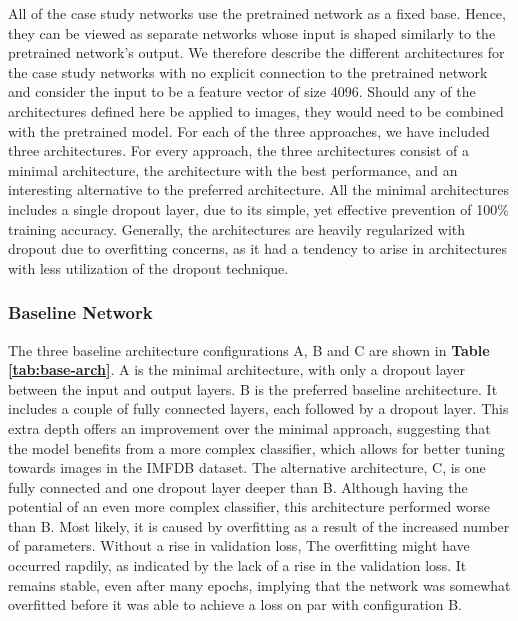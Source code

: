 
All of the case study networks use the pretrained network as a fixed base. Hence, they can be viewed as separate networks whose input is shaped similarly to the pretrained network's output. We therefore describe the different architectures for the case study networks with no explicit connection to the pretrained network and consider the input to be a feature vector of size 4096. Should any of the architectures defined here be applied to images, they would need to be combined with the pretrained model. For each of the three approaches, we have included three architectures. For every approach, the three architectures consist of a minimal architecture, the architecture with the best performance, and an interesting alternative to the preferred architecture. All the minimal architectures includes a single dropout layer, due to its simple, yet effective prevention of 100\% training accuracy. Generally, the architectures are heavily regularized with dropout due to overfitting concerns, as it had a tendency to arise in architectures with less utilization of the dropout technique. 


\subsubsection{Baseline Network}



The three baseline architecture configurations A, B and C are shown in \textbf{Table \ref{tab:base-arch}}. A is the minimal architecture, with only a dropout layer between the input and output layers. B is the preferred baseline architecture. It includes a couple of fully connected layers, each followed by a dropout layer. This extra depth offers an improvement over the minimal approach, suggesting that the model benefits from a more complex classifier, which allows for better tuning towards images in the IMFDB dataset. The alternative architecture, C, is one fully connected and one dropout layer deeper than B. Although having the potential of an even more complex classifier, this architecture performed worse than B. Most likely, it is caused by overfitting as a result of the increased number of parameters. Without a rise in validation loss, The overfitting might have occurred rapdily, as indicated by the lack of a rise in the validation loss. It remains stable, even after many epochs, implying that the network was somewhat overfitted before it was able to achieve a loss on par with configuration B.

